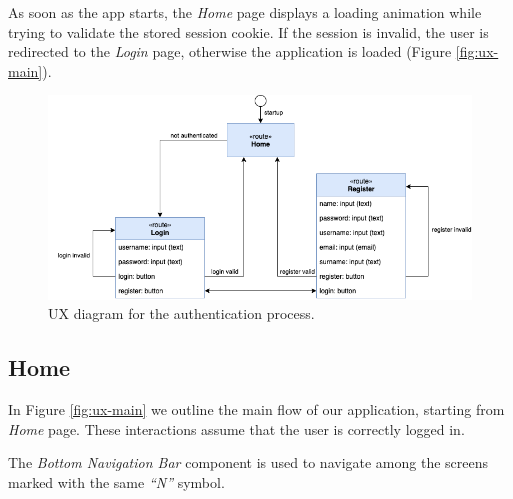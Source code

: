 As soon as the app starts, the \emph{Home} page displays a loading animation while trying to validate the stored session cookie. 
If the session is invalid, the user is redirected to the \emph{Login} page, otherwise the application is loaded (Figure \ref{fig:ux-main}).

\begin{figure}[H]
      \includegraphics{ux-diagram/ux-auth.png}
      \caption{UX diagram for the authentication process.}
      \label{fig:ux-auth}
\end{figure}

\subsection{Home}
In Figure \ref{fig:ux-main} we outline the main flow of our application, starting from \emph{Home} page.
These interactions assume that the user is correctly logged in.

The \emph{Bottom Navigation Bar} component is used to navigate among the screens marked with the same \emph{``N''} symbol.

